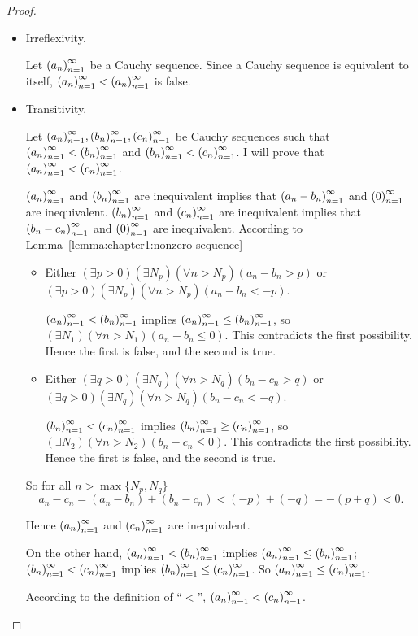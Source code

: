 \begin{proof}
    \begin{itemize}
        \item Irreflexivity.

              Let ${\left({a_{n}}\right)}^{\infty}_{n=1}$ be a Cauchy sequence. Since a Cauchy sequence is equivalent to itself, ${\left({a_{n}}\right)}^{\infty}_{n=1} < {\left({a_{n}}\right)}^{\infty}_{n=1}$ is false.
        \item Transitivity.

              Let ${\left({a_{n}}\right)}^{\infty}_{n=1}, {\left({b_{n}}\right)}^{\infty}_{n=1}, {\left({c_{n}}\right)}^{\infty}_{n=1}$ be Cauchy sequences such that ${\left({a_{n}}\right)}^{\infty}_{n=1} < {\left({b_{n}}\right)}^{\infty}_{n=1}$ and ${\left({b_{n}}\right)}^{\infty}_{n=1} < {\left({c_{n}}\right)}^{\infty}_{n=1}$. I will prove that ${\left({a_{n}}\right)}^{\infty}_{n=1} < {\left({c_{n}}\right)}^{\infty}_{n=1}$.

              ${\left({a_{n}}\right)}^{\infty}_{n=1}$ and ${\left({b_{n}}\right)}^{\infty}_{n=1}$ are inequivalent implies that ${\left({a_{n} - b_{n}}\right)}^{\infty}_{n=1}$ and ${\left({0}\right)}^{\infty}_{n=1}$ are inequivalent. ${\left({b_{n}}\right)}^{\infty}_{n=1}$ and ${\left({c_{n}}\right)}^{\infty}_{n=1}$ are inequivalent implies that ${\left({b_{n} - c_{n}}\right)}^{\infty}_{n=1}$ and ${\left({0}\right)}^{\infty}_{n=1}$ are inequivalent. According to Lemma~\ref{lemma:chapter1:nonzero-sequence}
              \begin{itemize}
                  \item Either $(\exists p > 0)(\exists N_{p})(\forall n > N_{p})(a_{n} - b_{n} > p)$ or $(\exists p > 0)(\exists N_{p})(\forall n > N_{p})(a_{n} - b_{n} < -p)$.

                        ${\left({a_{n}}\right)}^{\infty}_{n=1} < {\left({b_{n}}\right)}^{\infty}_{n=1}$ implies ${\left({a_{n}}\right)}^{\infty}_{n=1}\le{\left({b_{n}}\right)}^{\infty}_{n=1}$, so $(\exists N_{1})(\forall n > N_{1})(a_{n} - b_{n} \le 0)$. This contradicts the first possibility. Hence the first is false, and the second is true.
                  \item Either $(\exists q > 0)(\exists N_{q})(\forall n > N_{q})(b_{n} - c_{n} > q)$ or $(\exists q > 0)(\exists N_{q})(\forall n > N_{q})(b_{n} - c_{n} < -q)$.

                        ${\left({b_{n}}\right)}^{\infty}_{n=1} < {\left({c_{n}}\right)}^{\infty}_{n=1}$ implies ${\left({b_{n}}\right)}^{\infty}_{n=1}\ge{\left({c_{n}}\right)}^{\infty}_{n=1}$, so $(\exists N_{2})(\forall n > N_{2})(b_{n} - c_{n} \le 0)$. This contradicts the first possibility. Hence the first is false, and the second is true.
              \end{itemize}

              So for all $n > \max\{ N_{p}, N_{q} \}$
              \[
                  a_{n} - c_{n} = (a_{n} - b_{n}) + (b_{n} - c_{n}) < (-p) + (-q) = -(p+q) < 0.
              \]

              Hence ${\left({a_{n}}\right)}^{\infty}_{n=1}$ and ${\left({c_{n}}\right)}^{\infty}_{n=1}$ are inequivalent.

              On the other hand, ${\left({a_{n}}\right)}^{\infty}_{n=1} < {\left({b_{n}}\right)}^{\infty}_{n=1}$ implies ${\left({a_{n}}\right)}^{\infty}_{n=1}\le{\left({b_{n}}\right)}^{\infty}_{n=1}$; ${\left({b_{n}}\right)}^{\infty}_{n=1} < {\left({c_{n}}\right)}^{\infty}_{n=1}$ implies ${\left({b_{n}}\right)}^{\infty}_{n=1}\le{\left({c_{n}}\right)}^{\infty}_{n=1}$. So ${\left({a_{n}}\right)}^{\infty}_{n=1}\le{\left({c_{n}}\right)}^{\infty}_{n=1}$.

              According to the definition of ``$<$'', ${\left({a_{n}}\right)}^{\infty}_{n=1} < {\left({c_{n}}\right)}^{\infty}_{n=1}$.
    \end{itemize}
\end{proof}

